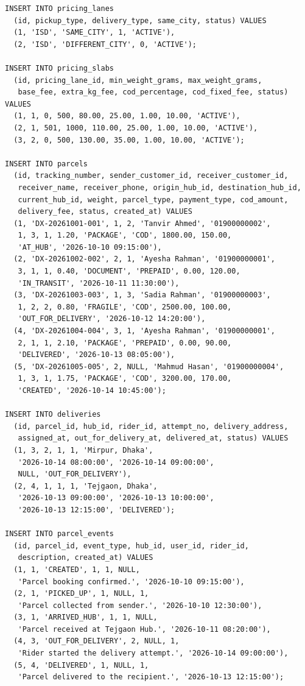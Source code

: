 \documentclass[11pt,a4paper]{article}
\begin{document}
\begin{lstlisting}
INSERT INTO pricing_lanes
  (id, pickup_type, delivery_type, same_city, status) VALUES
  (1, 'ISD', 'SAME_CITY', 1, 'ACTIVE'),
  (2, 'ISD', 'DIFFERENT_CITY', 0, 'ACTIVE');

INSERT INTO pricing_slabs
  (id, pricing_lane_id, min_weight_grams, max_weight_grams,
   base_fee, extra_kg_fee, cod_percentage, cod_fixed_fee, status) VALUES
  (1, 1, 0, 500, 80.00, 25.00, 1.00, 10.00, 'ACTIVE'),
  (2, 1, 501, 1000, 110.00, 25.00, 1.00, 10.00, 'ACTIVE'),
  (3, 2, 0, 500, 130.00, 35.00, 1.00, 10.00, 'ACTIVE');

INSERT INTO parcels
  (id, tracking_number, sender_customer_id, receiver_customer_id,
   receiver_name, receiver_phone, origin_hub_id, destination_hub_id,
   current_hub_id, weight, parcel_type, payment_type, cod_amount,
   delivery_fee, status, created_at) VALUES
  (1, 'DX-20261001-001', 1, 2, 'Tanvir Ahmed', '01900000002',
   1, 3, 1, 1.20, 'PACKAGE', 'COD', 1800.00, 150.00,
   'AT_HUB', '2026-10-10 09:15:00'),
  (2, 'DX-20261002-002', 2, 1, 'Ayesha Rahman', '01900000001',
   3, 1, 1, 0.40, 'DOCUMENT', 'PREPAID', 0.00, 120.00,
   'IN_TRANSIT', '2026-10-11 11:30:00'),
  (3, 'DX-20261003-003', 1, 3, 'Sadia Rahman', '01900000003',
   1, 2, 2, 0.80, 'FRAGILE', 'COD', 2500.00, 100.00,
   'OUT_FOR_DELIVERY', '2026-10-12 14:20:00'),
  (4, 'DX-20261004-004', 3, 1, 'Ayesha Rahman', '01900000001',
   2, 1, 1, 2.10, 'PACKAGE', 'PREPAID', 0.00, 90.00,
   'DELIVERED', '2026-10-13 08:05:00'),
  (5, 'DX-20261005-005', 2, NULL, 'Mahmud Hasan', '01900000004',
   1, 3, 1, 1.75, 'PACKAGE', 'COD', 3200.00, 170.00,
   'CREATED', '2026-10-14 10:45:00');

INSERT INTO deliveries
  (id, parcel_id, hub_id, rider_id, attempt_no, delivery_address,
   assigned_at, out_for_delivery_at, delivered_at, status) VALUES
  (1, 3, 2, 1, 1, 'Mirpur, Dhaka',
   '2026-10-14 08:00:00', '2026-10-14 09:00:00',
   NULL, 'OUT_FOR_DELIVERY'),
  (2, 4, 1, 1, 1, 'Tejgaon, Dhaka',
   '2026-10-13 09:00:00', '2026-10-13 10:00:00',
   '2026-10-13 12:15:00', 'DELIVERED');

INSERT INTO parcel_events
  (id, parcel_id, event_type, hub_id, user_id, rider_id,
   description, created_at) VALUES
  (1, 1, 'CREATED', 1, 1, NULL,
   'Parcel booking confirmed.', '2026-10-10 09:15:00'),
  (2, 1, 'PICKED_UP', 1, NULL, 1,
   'Parcel collected from sender.', '2026-10-10 12:30:00'),
  (3, 1, 'ARRIVED_HUB', 1, 1, NULL,
   'Parcel received at Tejgaon Hub.', '2026-10-11 08:20:00'),
  (4, 3, 'OUT_FOR_DELIVERY', 2, NULL, 1,
   'Rider started the delivery attempt.', '2026-10-14 09:00:00'),
  (5, 4, 'DELIVERED', 1, NULL, 1,
   'Parcel delivered to the recipient.', '2026-10-13 12:15:00');


\end{lstlisting}
\end{document}
